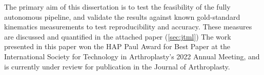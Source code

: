 The primary aim of this dissertation is to test the feasibility of the fully autonomous pipeline, and validate the results against known gold-standard kinematics measurements to test reproducibility and accuracy. These measures are discussed and quantified in the attached paper (\cref{sec:jtml}) The work presented in this paper won the HAP Paul Award for Best Paper at the International Society for Technology in Arthroplasty's 2022 Annual Meeting, and is currently under review for publication in the Journal of Arthroplasty.

